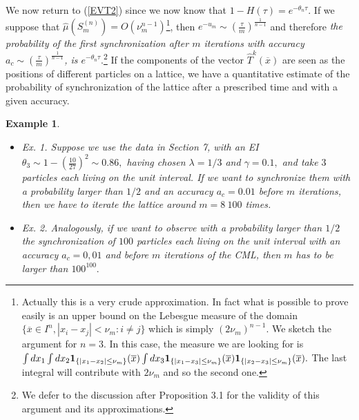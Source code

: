\documentclass[12pt,reqno,a4paper]{amsart}
\newtheorem{example}[thm]{Example}
\newcommand{\T}{{\mathcal{T}}}
\def\ox{\overline{x}}
\def\T{\hat{T}}
\begin{document}
We now return to (\ref{EVT2}) since we now know that $1-H(\tau)=e^{-\theta_n \tau}.$ If we suppose that $\hat{\mu}(S^{(n)}_m)=O(\nu_m^{n-1})$\footnote{ Actually this is a very crude approximation. In fact what  is possible to prove easily is an upper bound on the Lebesgue measure of the domain $\{\overline{x}\in I^n, |x_i-x_j|<\nu_m: i\neq j\}$  which is simply $(2\nu_m)^{n-1}.$ We sketch the argument for $n=3$. In this case, the measure we are looking for is $\int dx_1 \int dx_2 {\bf 1}_{\{|x_1-x_2|\le \nu_m\}}(\ox) \int dx_3 {\bf 1}_{\{|x_1-x_3|\le \nu_m\}}(\ox){\bf 1}_{\{|x_2-x_3|\le \nu_m\}}(\ox).$ The last integral will contribute with $2\nu_m$ and so the second one.}, then $e^{-u_m}\sim \left(\frac{\tau}{m}\right)^{\frac{1}{n-1}}$ and therefore {\em the probability of the first synchronization after $m$ iterations  with accuracy $a_c\sim \left(\frac{\tau}{m}\right)^{\frac{1}{n-1}}$, is $e^{-\theta_n\tau}.$}\footnote{We defer to the discussion after Proposition 3.1 for the validity of this argument and its approximations.} If the components of the vector $\T^k(\overline{x})$ are seen as the positions of different particles on a  lattice, we have a quantitative estimate of the probability of synchronization of the lattice after a prescribed time and with a given accuracy.
\begin{example}\label{EX}

\begin{itemize}
\item
{\em Ex. 1.} Suppose  we use the data in Section 7, with an EI  $\theta_3\sim 1-(\frac{10}{27})^2\sim 0.86,$ having chosen $\lambda=1/3$ and $\gamma=0.1,$ and take $3$ particles  each living on the unit interval. If we want to synchronize them with a probability larger than $1/2$ and  an accuracy $a_c=0.01$ before $m$ iterations, then  we have to iterate the lattice around $m=8 \ 100$ times.
\item {\em Ex. 2.} Analogously, if we want to observe with a probability larger than $1/2$ the synchronization of $100$ particles  each living on the unit interval  with an accuracy $a_c = 0,01$ and  before $m$ iterations of the CML, then $m$ has to be larger than $100^{100}.$
\end{itemize}
\end{example}
\end{document}
